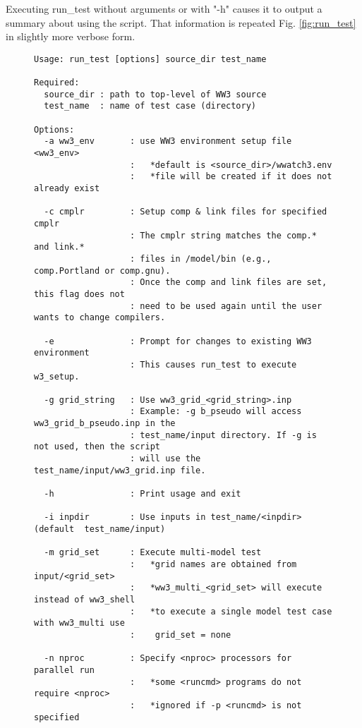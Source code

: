 \documentclass[12pt]{article}
\newcommand{\file}{\sf}
\newcounter{myfigno}[section]
\newenvironment{myfig}[1]{\begin{figure}[#1]
                         \refstepcounter{myfigno}}                       
                        {\end{figure}}
\begin{document}
Executing {\file run\_test} without arguments or with "-h" causes it to output
a summary about using the script. That information is repeated Fig.
\ref{fig:run_test} in slightly more verbose form.

\begin{myfig}{tbp}
\begin{center}
\begin{minipage}[c]{4.5in}
\vspace{-10mm}
{\scriptsize \begin{verbatim}
Usage: run_test [options] source_dir test_name

Required:
  source_dir : path to top-level of WW3 source
  test_name  : name of test case (directory)

Options:
  -a ww3_env       : use WW3 environment setup file <ww3_env>
                   :   *default is <source_dir>/wwatch3.env
                   :   *file will be created if it does not already exist

  -c cmplr         : Setup comp & link files for specified cmplr
                   : The cmplr string matches the comp.* and link.*
                   : files in /model/bin (e.g., comp.Portland or comp.gnu).
                   : Once the comp and link files are set, this flag does not
                   : need to be used again until the user wants to change compilers.

  -e               : Prompt for changes to existing WW3 environment
                   : This causes run_test to execute w3_setup.

  -g grid_string   : Use ww3_grid_<grid_string>.inp
                   : Example: -g b_pseudo will access ww3_grid_b_pseudo.inp in the
                   : test_name/input directory. If -g is not used, then the script
                   : will use the test_name/input/ww3_grid.inp file.

  -h               : Print usage and exit

  -i inpdir        : Use inputs in test_name/<inpdir> (default  test_name/input)

  -m grid_set      : Execute multi-model test
                   :   *grid names are obtained from input/<grid_set>
                   :   *ww3_multi_<grid_set> will execute instead of ww3_shell
                   :   *to execute a single model test case with ww3_multi use
                   :    grid_set = none

  -n nproc         : Specify <nproc> processors for parallel run
                   :   *some <runcmd> programs do not require <nproc>
                   :   *ignored if -p <runcmd> is not specified


\end{verbatim}}
\end{minipage}
\end{center}
\end{myfig}
\end{document}
